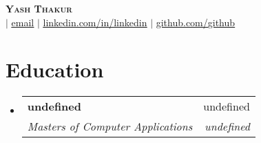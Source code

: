 \documentclass[letterpaper,11pt]{article}
\makeatletter
\newcommand{\resumeSubheading}[4]{
  \vspace{-2pt}\item
    \begin{tabular*}{0.97\textwidth}[t]{l@{\extracolsep{\fill}}r}
      \textbf{#1} & #2 \\
      \textit{\small#3} & \textit{\small #4} \\
    \end{tabular*}\vspace{-7pt}
}
\newcommand{\resumeSubHeadingListStart}{\begin{itemize}[leftmargin=0.15in, label={}]}
\newcommand{\resumeSubHeadingListEnd}{\end{itemize}}
\makeatother
\begin{document}
\begin{center}
    \textbf{\Huge \scshape Yash Thakur} \\ \vspace{1pt}
    \small  $|$ \href{mailto:yta0088@gmail.com}{\underline{{{email}}}} $|$ 
    \href{https://linkedin.com/in/https://www.linkedin.com/in/sincerelyyyash/}{\underline{linkedin.com/in/{{linkedin}}}} $|$
    \href{https://github.com/https://github.com/sincerelyyyash/}{\underline{github.com/{{github}}}}
\end{center}

\section{Education}
\resumeSubHeadingListStart
\resumeSubheading{undefined}{undefined}{Masters of Computer Applications}{undefined}
\resumeSubHeadingListEnd

\end{document}
